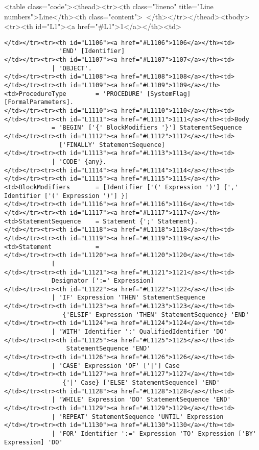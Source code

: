 <table class="code"><thead><tr><th class="lineno" title="Line numbers">Line</th><th class="content"> </th></tr></thead><tbody><tr><th id="L1"><a href="#L1">1</a></th><td>\documentclass[a4paper,11pt]{article}
\begin{document}
\begin{lstlisting}[language = EBNF, frame=none,xleftmargin=0mm]
</td></tr><tr><th id="L1106"><a href="#L1106">1106</a></th><td>                       'END' [Identifier]
</td></tr><tr><th id="L1107"><a href="#L1107">1107</a></th><td>                     | 'OBJECT'.
</td></tr><tr><th id="L1108"><a href="#L1108">1108</a></th><td>
</td></tr><tr><th id="L1109"><a href="#L1109">1109</a></th><td>ProcedureType        = 'PROCEDURE' [SystemFlag] [FormalParameters].
</td></tr><tr><th id="L1110"><a href="#L1110">1110</a></th><td>
</td></tr><tr><th id="L1111"><a href="#L1111">1111</a></th><td>Body                 = 'BEGIN' ['{' BlockModifiers '}'] StatementSequence
</td></tr><tr><th id="L1112"><a href="#L1112">1112</a></th><td>                       ['FINALLY' StatementSequence]
</td></tr><tr><th id="L1113"><a href="#L1113">1113</a></th><td>                     | 'CODE' {any}.
</td></tr><tr><th id="L1114"><a href="#L1114">1114</a></th><td>
</td></tr><tr><th id="L1115"><a href="#L1115">1115</a></th><td>BlockModifiers       = [Identifier ['(' Expression ')'] {',' Identifier ['(' Expression ')'] }]
</td></tr><tr><th id="L1116"><a href="#L1116">1116</a></th><td>
</td></tr><tr><th id="L1117"><a href="#L1117">1117</a></th><td>StatementSequence    = Statement {';' Statement}.
</td></tr><tr><th id="L1118"><a href="#L1118">1118</a></th><td>
</td></tr><tr><th id="L1119"><a href="#L1119">1119</a></th><td>Statement            =
</td></tr><tr><th id="L1120"><a href="#L1120">1120</a></th><td>                     [
</td></tr><tr><th id="L1121"><a href="#L1121">1121</a></th><td>                     Designator [':=' Expression]
</td></tr><tr><th id="L1122"><a href="#L1122">1122</a></th><td>                     | 'IF' Expression 'THEN' StatementSequence
</td></tr><tr><th id="L1123"><a href="#L1123">1123</a></th><td>                        {'ELSIF' Expression 'THEN' StatementSequence} 'END'
</td></tr><tr><th id="L1124"><a href="#L1124">1124</a></th><td>                     | 'WITH' Identifier ':' QualifiedIdentifier 'DO'
</td></tr><tr><th id="L1125"><a href="#L1125">1125</a></th><td>                         StatementSequence 'END'
</td></tr><tr><th id="L1126"><a href="#L1126">1126</a></th><td>                     | 'CASE' Expression 'OF' ['|'] Case
</td></tr><tr><th id="L1127"><a href="#L1127">1127</a></th><td>                        {'|' Case} ['ELSE' StatementSequence] 'END'
</td></tr><tr><th id="L1128"><a href="#L1128">1128</a></th><td>                     | 'WHILE' Expression 'DO' StatementSequence 'END'
</td></tr><tr><th id="L1129"><a href="#L1129">1129</a></th><td>                     | 'REPEAT' StatementSequence 'UNTIL' Expression
</td></tr><tr><th id="L1130"><a href="#L1130">1130</a></th><td>                     | 'FOR' Identifier ':=' Expression 'TO' Expression ['BY' Expression] 'DO'

\end{lstlisting}
\end{document}
